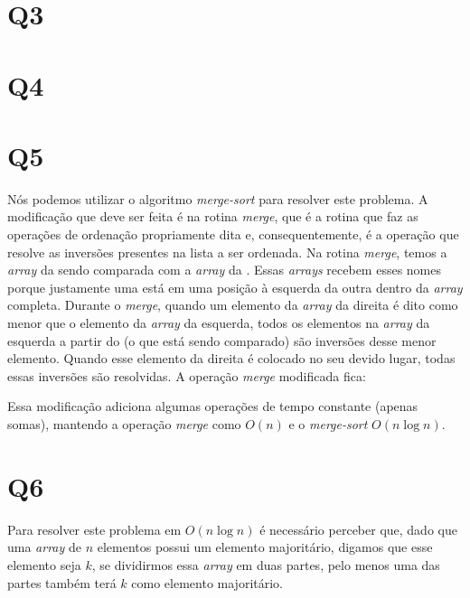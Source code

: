 \documentclass[12pt, a4paper]{article}
\begin{document}
\section*{Q3}






\section*{Q4}






\section*{Q5}

Nós podemos utilizar o algoritmo \textit{merge-sort} para resolver este problema. A modificação que deve ser feita é na rotina \textit{merge}, que é a rotina que faz as operações de ordenação propriamente dita e, consequentemente, é a operação que resolve as inversões presentes na lista a ser ordenada. Na rotina \textit{merge}, temos a \textit{array} da  sendo comparada com a \textit{array} da . Essas \textit{arrays} recebem esses nomes porque justamente uma está em uma posição à esquerda da outra dentro da \textit{array} completa. Durante o \textit{merge}, quando um elemento da \textit{array} da direita é dito como menor que o elemento da \textit{array} da esquerda, todos os elementos na \textit{array} da esquerda a partir do  (o que está sendo comparado) são inversões desse menor elemento. Quando esse elemento da direita é colocado no seu devido lugar, todas essas inversões são resolvidas. A operação \textit{merge} modificada fica:



Essa modificação adiciona algumas operações de tempo constante (apenas somas), mantendo a operação \textit{merge} como $O(n)$ e o \textit{merge-sort} $O(n\log{n})$.




\section*{Q6}

Para resolver este problema em $O(n\log{n})$ é necessário perceber que, dado que uma \textit{array} de $n$ elementos possui um elemento majoritário, digamos que esse elemento seja $k$, se dividirmos essa \textit{array} em duas partes, pelo menos uma das partes também terá $k$ como elemento majoritário.
\end{document}
